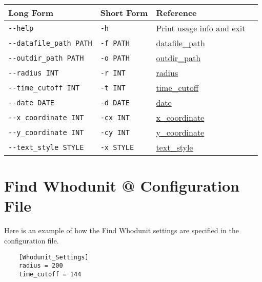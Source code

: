 \begin{table}[h]
\begin{tabular}{|l|l|l|l|}
  \hline
  Long Form & Short Form & Reference \\ \hline \hline

  \verb=--help= & \verb=-h= & Print usage info and exit \\ \hline
  \verb=--datafile_path PATH= & \verb=-f PATH= & \hyperlink{global-datafile-path}{datafile\_path} \\ \hline
  \verb=--outdir_path PATH= & \verb=-o PATH= & \hyperlink{global-outdir-path}{outdir\_path} \\ \hline
  \verb=--radius INT= & \verb=-r INT= & \hyperlink{whodunit-radius}{radius} \\ \hline
  \verb=--time_cutoff INT= & \verb=-t INT= & \hyperlink{whodunit-time-cutoff}{time\_cutoff} \\ \hline
  \verb=--date DATE= & \verb=-d DATE= & \hyperlink{whodunit-date}{date} \\ \hline
  \verb=--x_coordinate INT= & \verb=-cx INT= & \hyperlink{whodunit-x-coordinate}{x\_coordinate} \\ \hline
  \verb=--y_coordinate INT= & \verb=-cy INT= & \hyperlink{whodunit-y-coordinate}{y\_coordinate} \\ \hline
  \verb=--text_style STYLE= & \verb=-x STYLE= & \hyperlink{whodunit-text-style}{text\_style} \\ \hline

\end{tabular}
\end{table}

\FloatBarrier

\section{Find Whodunit @ Configuration File}

Here is an example of how the Find Whodunit settings are specified
in the configuration file.

\begin{verbatim}
    [Whodunit_Settings]
    radius = 200
    time_cutoff = 144
\end{verbatim}

